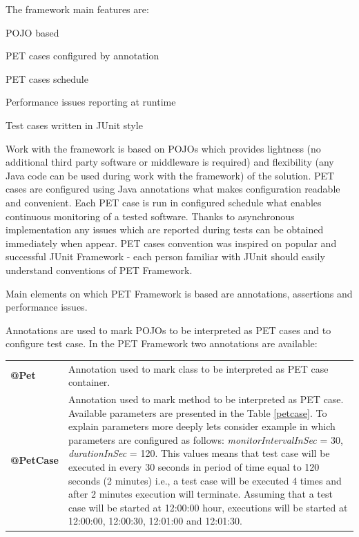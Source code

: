 \documentclass[10pt,a4paper]{article}
\let\tempone\itemize
\let\temptwo\enditemize
\renewenvironment{itemize}{\tempone\addtolength{\itemsep}{-0.4\baselineskip}}{\temptwo}
\begin{document}
The framework main features are:
\begin{itemize}
\item POJO based
\item PET cases configured by annotation
\item PET cases schedule
\item Performance issues reporting at runtime 
\item Test cases written in JUnit \cite{junit} style
\end{itemize}

Work with the framework is based on POJOs which provides lightness (no additional third party software or middleware is required) and flexibility (any Java code can be used during work with the framework) of the solution. PET cases are  configured using Java annotations what makes configuration readable and convenient. Each PET case is run in configured schedule what enables continuous monitoring of a tested software. Thanks to asynchronous implementation any issues which are reported during tests can be obtained immediately when appear. PET cases convention was inspired on popular and successful JUnit Framework - each person familiar with JUnit should easily understand conventions of PET Framework.       

Main elements on which PET Framework is based are annotations, assertions and performance issues. 

Annotations are used to mark POJOs to be interpreted as PET cases and to configure test case. In the PET Framework two annotations are available:

\begin{table}[!htb]
\def\arraystretch{1.5}
\begin{tabularx}{\textwidth}{p{1.4cm}X}
\textbf{@Pet} 	  & Annotation used to mark class to be interpreted as PET case container. \\ 
\textbf{@PetCase} & Annotation used to mark method to be interpreted as PET case. Available parameters are presented in the Table \ref{petcase}. To explain parameters more deeply lets consider example in which parameters are configured as follows: \textit{monitorIntervalInSec} = 30, \textit{durationInSec} = 120. This values means that test case will be executed in every 30 seconds in period of time equal to 120 seconds (2 minutes) i.e., a test case will be executed 4 times and after 2 minutes execution will terminate. Assuming that a test case will be started at 12:00:00 hour, executions will be started at 12:00:00, 12:00:30, 12:01:00 and 12:01:30. 
\end{tabularx}
\end{table}
\end{document}
